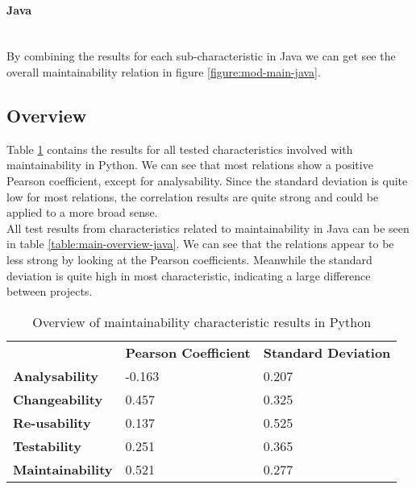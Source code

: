 \documentclass[twoside]{uva-inf-bachelor-thesis}
\newcommand{\myparagraph}[1]{\paragraph{#1}\mbox{}\\}
\begin{document}
\myparagraph{Java}
By combining the results for each sub-characteristic in Java we can get see the overall maintainability relation in figure \ref{figure:mod-main-java}.

\subsection{Overview}
Table \ref{table:main-overview} contains the results for all tested characteristics involved with maintainability in Python. We can see that most relations show a positive Pearson coefficient, except for analysability. Since the standard deviation is quite low for most relations, the correlation results are quite strong and could be applied to a more broad sense.\\

All test results from characteristics related to maintainability in Java can be seen in table \ref{table:main-overview-java}. We can see that the relations appear to be less strong by looking at the Pearson coefficients. Meanwhile the standard deviation is quite high in most characteristic, indicating a large difference between projects.

\begin{table}[H]
\centering
\caption{Overview of maintainability characteristic results in Python}
\label{table:main-overview}
\begin{tabular}{lll}
                         & \textbf{Pearson Coefficient} & \textbf{Standard Deviation} \\
\textbf{Analysability}   & -0.163                       & 0.207                       \\
\textbf{Changeability}   & 0.457                        & 0.325                       \\
\textbf{Re-usability}    & 0.137                        & 0.525                       \\
\textbf{Testability}     & 0.251                        & 0.365                       \\
\textbf{Maintainability} & 0.521                        & 0.277                      
\end{tabular}
\end{table}
\end{document}
